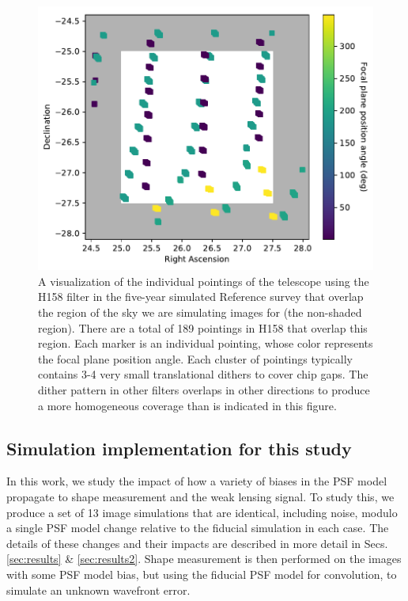 \documentclass[aps,prd, amsmath,amssymb,superscriptaddress,showkeys,nofootinbib,reprint,preprintnumbers]{revtex4-1}
\begin{document}
\begin{figure}
\begin{center}
\includegraphics[width=\columnwidth]{figures/pointings.pdf}
\end{center}
\caption[]{
A visualization of the individual pointings of the telescope using the H158 filter in the five-year simulated Reference survey that overlap the region of the sky we are simulating images for (the non-shaded region). There are a total of 189 pointings in H158 that overlap this region. Each marker is an individual pointing, whose color represents the focal plane position angle. Each cluster of pointings typically contains 3-4 very small translational dithers to cover chip gaps. The dither pattern in other filters overlaps in other directions to produce a more homogeneous coverage than is indicated in this figure. 
\label{fig:pointings}}
\end{figure}

\subsection{Simulation implementation for this study}

In this work, we study the impact of how a variety of biases in the PSF model propagate to shape measurement and the weak lensing signal. 
To study this, we produce a set of 13 image simulations that are identical, including noise, modulo a single PSF model change relative to the fiducial simulation in each case. 
The details of these changes and their impacts are described in more detail in Secs. \ref{sec:results} \&  \ref{sec:results2}. 
Shape measurement is then performed on the images with some PSF model bias, but using the fiducial PSF model for convolution, to simulate an unknown wavefront error.
\end{document}

